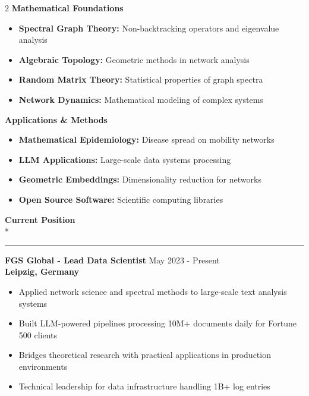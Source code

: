 \documentclass[11pt,a4paper]{article}
\newlength{\spacexs}    \setlength{\spacexs}{6pt}      %
\newlength{\spacesm}    \setlength{\spacesm}{11pt}     %
\newlength{\spacexl}    \setlength{\spacexl}{38pt}     %
\newcommand{\bodytext}[1]{%
    {\fontsize{10pt}{14pt}\selectfont\color{charcoal} #1}%
}
\newcommand{\bodytextbold}[1]{%
    {\fontsize{10pt}{14pt}\selectfont\color{charcoal}\bfseries #1}%
}
\newcommand{\microtext}[1]{%
    {\fontsize{8pt}{11pt}\selectfont\color{mediumgray} #1}%
}
\newcommand{\sectiontitle}[1]{%
    \needspace{4\baselineskip}%
    \vspace{\spacexl}%
    {\fontsize{12pt}{14pt}\selectfont\color{navy}\bfseries #1}\\*%
    \vspace{1pt}%
    {\color{plum}\rule{20pt}{1pt}}%
    \vspace{0pt}%
}
\newcommand{\plumbullet}{{\color{plum}$\bullet$}\space}
\newcommand{\jobduration}[1]{%
    {\fontspec{JetBrains Mono}\microtext{#1}}
}
\newcommand{\companyname}[1]{%
    {\color{darkgray}\bfseries #1}
}
\begin{document}
\setlength{\multicolsep}{0pt}
\begin{multicols}{2}
\raggedcolumns
\bodytextbold{Mathematical Foundations}
\vspace{2pt}
\begin{itemize}[leftmargin=15pt,itemindent=0pt,labelwidth=10pt,labelsep=5pt,itemsep=1pt,parsep=0pt,topsep=0pt,partopsep=0pt]
    \item[\plumbullet] \bodytext{\textbf{Spectral Graph Theory:} Non-backtracking operators and eigenvalue analysis}
    \item[\plumbullet] \bodytext{\textbf{Algebraic Topology:} Geometric methods in network analysis}
    \item[\plumbullet] \bodytext{\textbf{Random Matrix Theory:} Statistical properties of graph spectra}
    \item[\plumbullet] \bodytext{\textbf{Network Dynamics:} Mathematical modeling of complex systems}
\end{itemize}

\columnbreak

\bodytextbold{Applications \& Methods}
\vspace{2pt}
\begin{itemize}[leftmargin=15pt,itemindent=0pt,labelwidth=10pt,labelsep=5pt,itemsep=1pt,parsep=0pt,topsep=0pt,partopsep=0pt]
    \item[\plumbullet] \bodytext{\textbf{Mathematical Epidemiology:} Disease spread on mobility networks}
    \item[\plumbullet] \bodytext{\textbf{LLM Applications:} Large-scale data systems processing}
    \item[\plumbullet] \bodytext{\textbf{Geometric Embeddings:} Dimensionality reduction for networks}
    \item[\plumbullet] \bodytext{\textbf{Open Source Software:} Scientific computing libraries}
\end{itemize}
\end{multicols}

\sectiontitle{Current Position}
\vspace{\spacesm}

\bodytext{\textbf{FGS Global - Lead Data Scientist}} \hfill \jobduration{May 2023 - Present}\\
\companyname{Leipzig, Germany}

\vspace{\spacexs}
\begin{itemize}[leftmargin=15pt,itemindent=0pt,labelwidth=10pt,labelsep=5pt,itemsep=2pt,parsep=0pt,topsep=0pt,partopsep=0pt]
    \item[\plumbullet] \bodytext{Applied network science and spectral methods to large-scale text analysis systems}
    \item[\plumbullet] \bodytext{Built LLM-powered pipelines processing 10M+ documents daily for Fortune 500 clients}
    \item[\plumbullet] \bodytext{Bridges theoretical research with practical applications in production environments}
    \item[\plumbullet] \bodytext{Technical leadership for data infrastructure handling 1B+ log entries}
\end{itemize}
\end{document}
